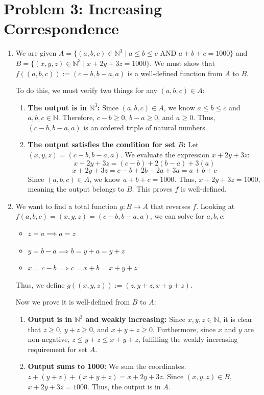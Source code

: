 \documentclass[11pt]{article}
\begin{document}
\section*{Problem 3: Increasing Correspondence}
\begin{enumerate}[label=\textbf{(\alph*)}]
    \item We are given $A = \{(a,b,c) \in \mathbb{N}^3 \mid a \le b \le c \text{ AND } a+b+c=1000\}$ and $B = \{(x,y,z) \in \mathbb{N}^3 \mid x+2y+3z=1000\}$. We must show that $f((a,b,c)) := (c-b, b-a, a)$ is a well-defined function from $A$ to $B$. 
    
    To do this, we must verify two things for any $(a,b,c) \in A$:
    \begin{enumerate}
        \item \textbf{The output is in $\mathbb{N}^3$:} Since $(a,b,c) \in A$, we know $a \le b \le c$ and $a,b,c \in \mathbb{N}$. Therefore, $c-b \ge 0$, $b-a \ge 0$, and $a \ge 0$. Thus, $(c-b, b-a, a)$ is an ordered triple of natural numbers.
        \item \textbf{The output satisfies the condition for set $B$:} Let $(x,y,z) = (c-b, b-a, a)$. We evaluate the expression $x + 2y + 3z$:
        $$x + 2y + 3z = (c-b) + 2(b-a) + 3(a)$$
        $$x + 2y + 3z = c - b + 2b - 2a + 3a = a + b + c$$
        Since $(a,b,c) \in A$, we know $a+b+c=1000$. Thus, $x+2y+3z = 1000$, meaning the output belongs to $B$. This proves $f$ is well-defined.
    \end{enumerate}

    \item We want to find a total function $g: B \to A$ that reverses $f$. Looking at $f(a,b,c) = (x,y,z) = (c-b, b-a, a)$, we can solve for $a, b, c$:
    \begin{itemize}
        \item $z = a \implies a = z$
        \item $y = b - a \implies b = y + a = y + z$
        \item $x = c - b \implies c = x + b = x + y + z$
    \end{itemize}
    Thus, we define $g((x,y,z)) := (z, y+z, x+y+z)$. 

    Now we prove it is well-defined from $B$ to $A$:
    \begin{enumerate}
        \item \textbf{Output is in $\mathbb{N}^3$ and weakly increasing:} Since $x, y, z \in \mathbb{N}$, it is clear that $z \ge 0$, $y+z \ge 0$, and $x+y+z \ge 0$. Furthermore, since $x$ and $y$ are non-negative, $z \le y+z \le x+y+z$, fulfilling the weakly increasing requirement for set $A$.
        \item \textbf{Output sums to 1000:} We sum the coordinates: $z + (y+z) + (x+y+z) = x + 2y + 3z$. Since $(x,y,z) \in B$, $x + 2y + 3z = 1000$. Thus, the output is in $A$.
    \end{enumerate}


\end{enumerate}
\end{document}
